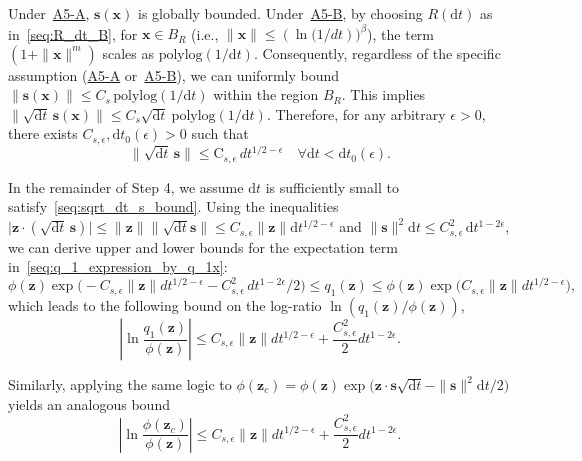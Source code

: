 \documentclass[
 longbibliography,
 twocolumn,
 superscriptaddress,
 amsmath,
 amssymb,
 amsthm,
 amsfonts,
 prl,
 floatfix,
]{revtex4-2}
\begin{document}
\begin{widetext}
Under~\hyperlink{assumption:A5-A}{A5-A}, $\bm s(\bm x)$ is globally bounded. Under~\hyperlink{assumption:A5-B}{A5-B}, by choosing $R(\mathrm dt)$ as in~\eqref{seq:R_dt_B}, for $\bm x\in B_R$ (i.e., $\|\bm x\|\leq (\ln\mathrm (1/dt))^\beta$), the term $(1+\|\bm x\|^m)$ scales as $\text{polylog}(1/\mathrm dt)$. Consequently, regardless of the specific assumption (\hyperlink{assumption:A5-A}{A5-A} or~\hyperlink{assumption:A5-B}{A5-B}), we can uniformly bound $\|\bm s(\bm x)\|\leq C_s\,\text{polylog}(1/\mathrm dt)$ within the region $B_R$. This implies $\|\sqrt{\mathrm dt}\,\bm s(\bm x)\|\leq C_s\sqrt{\mathrm dt}\ \text{polylog}(1/\mathrm dt)$. Therefore, for any arbitrary $\epsilon>0$, there exists $C_{s,\epsilon},\mathrm dt_0(\epsilon)>0$ such that
\begin{equation}
    \|\sqrt{\mathrm dt}\,\bm s\|\leq \mathrm C_{s,\epsilon}\,dt^{1/2-\epsilon}
    \quad\forall\mathrm dt<\mathrm dt_0(\epsilon).
    \label{seq:sqrt_dt_s_bound}
\end{equation}

In the remainder of Step 4, we assume $\mathrm dt$ is sufficiently small to satisfy~\eqref{seq:sqrt_dt_s_bound}. Using the inequalities $\big|\bm z\cdot(\sqrt{\mathrm dt}\,\bm s)\big|\leq\|\bm z\|\|\sqrt{\mathrm dt}\bm s\|\leq C_{s,\epsilon}\|\bm z\|\mathrm dt^{1/2-\epsilon}$ and $\|\bm s\|^2\mathrm dt\leq C_{s,\epsilon}^2\,\mathrm dt^{1-2\epsilon}$, we can derive upper and lower bounds for the expectation term in~\eqref{seq:q_1_expression_by_q_1x}:
\begin{equation}
    \phi(\bm z)\exp\big(\!-C_{s,\epsilon}\|\bm z\|dt^{1/2-\epsilon}
    -C_{s,\epsilon}^2\,dt^{1-2\epsilon}/2\big)
    \leq q_1(\bm z)
    \leq
    \phi(\bm z)\exp\big(C_{s,\epsilon}\|\bm z\|dt^{1/2-\epsilon}\big),
    \label{seq:p1_sandwitch_bound}
\end{equation}
which leads to the following bound on the log-ratio $\ln(q_1(\bm z)/\phi(\bm z))$,
\begin{equation}
    \left|\ln\frac{q_1(\bm z)}{\phi(\bm z)}\right|
    \leq
    C_{s,\epsilon}\|\bm z\|dt^{1/2-\epsilon}+
    \frac{C_{s,\epsilon}^2}{2}dt^{1-2\epsilon}.
    \label{seq:p1_z_bound}
\end{equation}

Similarly, applying the same logic to $\phi(\bm z_c)=\phi(\bm z)\exp\!\big(\bm z\cdot\bm s\sqrt{\mathrm dt}-\|\bm s\|^2\mathrm dt/2\big)$ yields an analogous bound
\begin{equation}
    \left|\ln\frac{\phi(\bm z_c)}{\phi(\bm z)}\right|
    \leq
    C_{s,\epsilon}\|\bm z\|dt^{1/2-\epsilon}+
    \frac{C_{s,\epsilon}^2}{2}dt^{1-2\epsilon}.
    \label{seq:phi_z_c_bound}
\end{equation}


\end{widetext}
\end{document}

